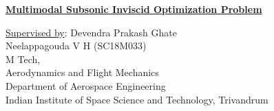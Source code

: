 \begin{frame}[plain,t]
\begin{titlepage}
    \begin{center}
        \color{brown}
        \vspace{-4.8cm}
        \textbf{\underline{Multimodal Subsonic Inviscid Optimization Problem}}\\
        \color{black}
        
        \vspace{0.5cm}
        \footnotesize{\underline{Supervised by}: Devendra Prakash Ghate}\\[2mm]
        Neelappagouda V H (SC18M033)\\[2mm]
        
        M Tech,\\
        Aerodynamics and Flight Mechanics\\ Department of Aerospace Engineering\\
        Indian Institute of Space Science and Technology, Trivandrum
    \end{center}
\end{titlepage}
\end{frame}
